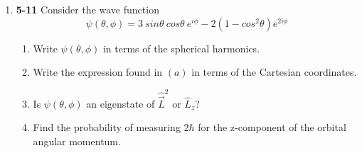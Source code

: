 \documentclass[fleqn]{article}
\begin{document}
\begin{enumerate}


    \item \textbf{5-11} Consider the wave function
    $$
      \psi(\theta, \phi)=3 ~ sin\theta ~ cos\theta ~ e^{i \phi}-2\left(1-cos^2\theta\right) e^{2i\phi}
    $$
    \begin{enumerate}
      \item Write $\psi(\theta, \phi)$ in terms of the spherical harmonics.



      \item Write the expression found in $(a)$ in terms of the Cartesian coordinates.


      \item Is $\psi(\theta, \phi)$ an eigenstate of $\hat{\overrightarrow{L}}^2$ or $\hat{L}_z$?


      \item Find the probability of measuring $2 \hbar$ for the z-component of the orbital angular momentum.


    \end{enumerate}

  \end{enumerate}
\end{document}

